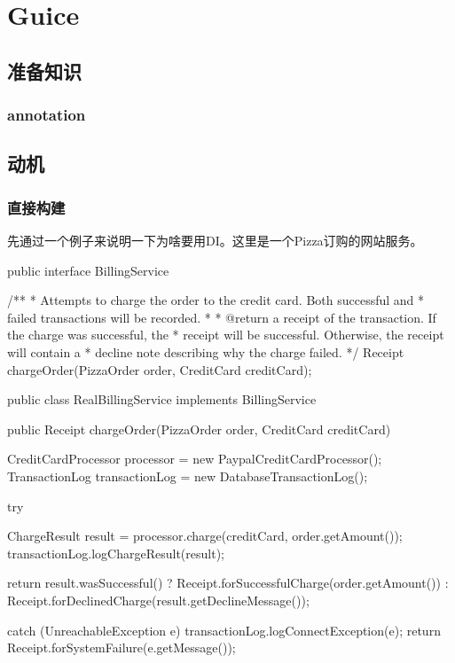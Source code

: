 \chapter{Guice}

\section{准备知识}

\subsection{annotation}

\section{动机}

\subsection{直接构建}

先通过一个例子来说明一下为啥要用DI。这里是一个Pizza订购的网站服务。

\begin{Java}[服务接口定义]
public interface BillingService {

  /**
   * Attempts to charge the order to the credit card. Both successful and
   * failed transactions will be recorded.
   *
   * @return a receipt of the transaction. If the charge was successful, the
   *      receipt will be successful. Otherwise, the receipt will contain a
   *      decline note describing why the charge failed.
   */
  Receipt chargeOrder(PizzaOrder order, CreditCard creditCard);
}
\end{Java}

\begin{Java}[服务接口的具体实现]
public class RealBillingService implements BillingService {
  public Receipt chargeOrder(PizzaOrder order, CreditCard creditCard) {
    CreditCardProcessor processor = new PaypalCreditCardProcessor();
    TransactionLog transactionLog = new DatabaseTransactionLog();

    try {
      ChargeResult result = processor.charge(creditCard, order.getAmount());
      transactionLog.logChargeResult(result);

      return result.wasSuccessful()
          ? Receipt.forSuccessfulCharge(order.getAmount())
          : Receipt.forDeclinedCharge(result.getDeclineMessage());
     } catch (UnreachableException e) {
      transactionLog.logConnectException(e);
      return Receipt.forSystemFailure(e.getMessage());
    }
  }
}
\end{Java}

